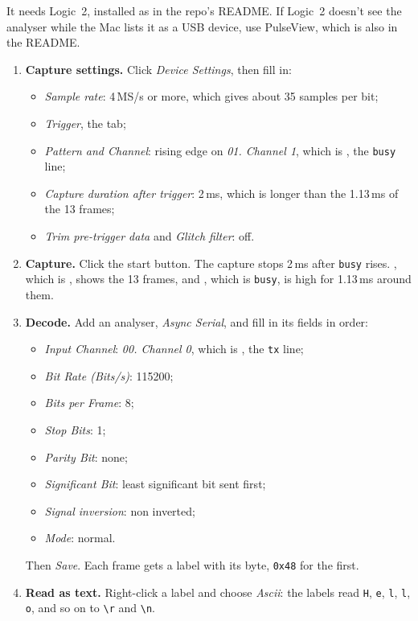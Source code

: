 \documentclass[11pt,a4paper]{article}
\begin{document}
It needs Logic~2, installed as in the repo’s README. If Logic~2 doesn’t see the analyser while the Mac lists it as a USB device, use PulseView, which is also in the README.

\begin{enumerate}
  \item \textbf{Capture settings.} Click \emph{Device Settings}, then fill in:
  \begin{itemize}[nosep]
    \item \emph{Sample rate}: 4\,MS/s or more, which gives about 35 samples per bit;
    \item \emph{Trigger}, the tab;
    \item \emph{Pattern and Channel}: rising edge on \emph{01. Channel 1}, which is , the \texttt{busy} line;
    \item \emph{Capture duration after trigger}: 2\,ms, which is longer than the 1.13\,ms of the 13 frames;
    \item \emph{Trim pre-trigger data} and \emph{Glitch filter}: off.
  \end{itemize}
  \item \textbf{Capture.} Click the start button. The capture stops 2\,ms after \texttt{busy} rises. , which is , shows the 13 frames, and , which is \texttt{busy}, is high for 1.13\,ms around them.
  \item \textbf{Decode.} Add an analyser, \emph{Async Serial}, and fill in its fields in order:
  \begin{itemize}[nosep]
    \item \emph{Input Channel}: \emph{00. Channel 0}, which is , the \texttt{tx} line;
    \item \emph{Bit Rate (Bits/s)}: 115200;
    \item \emph{Bits per Frame}: 8;
    \item \emph{Stop Bits}: 1;
    \item \emph{Parity Bit}: none;
    \item \emph{Significant Bit}: least significant bit sent first;
    \item \emph{Signal inversion}: non inverted;
    \item \emph{Mode}: normal.
  \end{itemize}
  Then \emph{Save}. Each frame gets a label with its byte, \texttt{0x48} for the first.
  \item \textbf{Read as text.} Right-click a label and choose \emph{Ascii}: the labels read \texttt{H}, \texttt{e}, \texttt{l}, \texttt{l}, \texttt{o}, and so on to \texttt{\textbackslash r} and \texttt{\textbackslash n}.
\end{enumerate}
\end{document}
